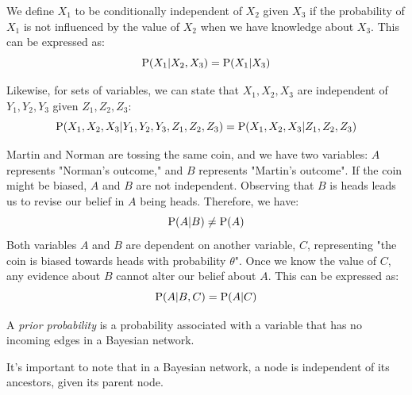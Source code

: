\begin{definition}
    We define $X_1$ to be conditionally independent of $X_2$ given $X_3$ if the probability of $X_1$ is not influenced by the value of $X_2$ when we have knowledge about $X_3$.  
    This can be expressed as:
    \[\textnormal{P}(X_1|X_2,X_3)=\textnormal{P}(X_1|X_3)\]
\end{definition}
Likewise, for sets of variables, we can state that $X_1, X_2, X_3$ are independent of $Y_1, Y_2, Y_3$ given $Z_1,Z_2,Z_3$:
\[\textnormal{P}(X_1,X_2,X_3|Y_1,Y_2,Y_3,Z_1,Z_2,Z_3)=\textnormal{P}(X_1,X_2,X_3|Z_1,Z_2,Z_3)\]
\begin{example}
    Martin and Norman are tossing the same coin, and we have two variables: $A$ represents "Norman's outcome," and $B$ represents "Martin's outcome". 
    If the coin might be biased, $A$ and $B$ are not independent. 
    Observing that $B$ is heads leads us to revise our belief in $A$ being heads. 
    Therefore, we have:
    \[\textnormal{P}(A|B) \neq \textnormal{P}(A)\]
    Both variables $A$ and $B$ are dependent on another variable, $C$, representing "the coin is biased towards heads with probability $\theta$".
    Once we know the value of $C$, any evidence about $B$ cannot alter our belief about $A$.
    This can be expressed as:
    \[\textnormal{P}(A|B,C)=\textnormal{P}(A|C)\]
\end{example}
\begin{definition}
    A \emph{prior probability} is a probability associated with a variable that has no incoming edges in a Bayesian network. 
\end{definition}
It's important to note that in a Bayesian network, a node is independent of its ancestors, given its parent node.
